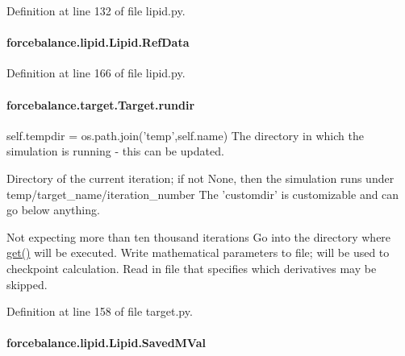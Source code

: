 Definition at line 132 of file lipid.\-py.

\hypertarget{classforcebalance_1_1lipid_1_1Lipid_a68d0649454816e6f1eb121166ccc9e00}{
\paragraph[{Ref\-Data}]{\setlength{\rightskip}{0pt plus 5cm}forcebalance.\-lipid.\-Lipid.\-Ref\-Data}}\label{classforcebalance_1_1lipid_1_1Lipid_a68d0649454816e6f1eb121166ccc9e00}


Definition at line 166 of file lipid.\-py.

\hypertarget{classforcebalance_1_1target_1_1Target_a6872de5b2d4273b82336ea5b0da29c9e}{
\paragraph[{rundir}]{\setlength{\rightskip}{0pt plus 5cm}forcebalance.\-target.\-Target.\-rundir\hspace{0.3cm}{\ttfamily [inherited]}}}\label{classforcebalance_1_1target_1_1Target_a6872de5b2d4273b82336ea5b0da29c9e}


self.\-tempdir = os.\-path.\-join('temp',self.\-name) The directory in which the simulation is running -\/ this can be updated. 

Directory of the current iteration; if not None, then the simulation runs under temp/target\-\_\-name/iteration\-\_\-number The 'customdir' is customizable and can go below anything.

Not expecting more than ten thousand iterations Go into the directory where \hyperlink{classforcebalance_1_1target_1_1Target_a1389888302c49d529716cb45b13a6f5a}{get()} will be executed. Write mathematical parameters to file; will be used to checkpoint calculation. Read in file that specifies which derivatives may be skipped. 

Definition at line 158 of file target.\-py.

\hypertarget{classforcebalance_1_1lipid_1_1Lipid_a07e86c96c0045df320ffde881315fec3}{
\paragraph[{Saved\-M\-Val}]{\setlength{\rightskip}{0pt plus 5cm}forcebalance.\-lipid.\-Lipid.\-Saved\-M\-Val}}\label{classforcebalance_1_1lipid_1_1Lipid_a07e86c96c0045df320ffde881315fec3}


